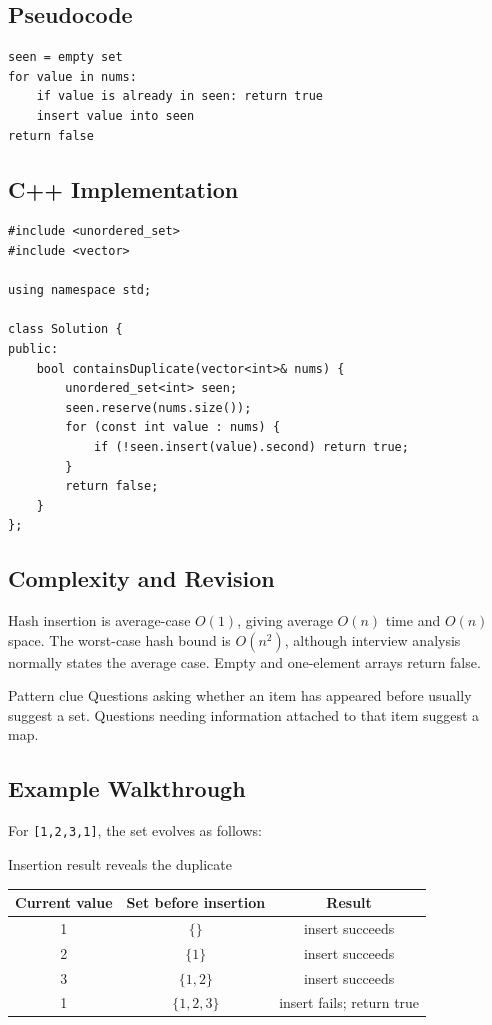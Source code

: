 \subsection{Pseudocode}
\begin{lstlisting}[style=pseudocode]
seen = empty set
for value in nums:
    if value is already in seen: return true
    insert value into seen
return false
\end{lstlisting}

\subsection{C++ Implementation}
\begin{lstlisting}[style=compactcode,caption={Complete C++ solution: Contains Duplicate}]
#include <unordered_set>
#include <vector>

using namespace std;

class Solution {
public:
    bool containsDuplicate(vector<int>& nums) {
        unordered_set<int> seen;
        seen.reserve(nums.size());
        for (const int value : nums) {
            if (!seen.insert(value).second) return true;
        }
        return false;
    }
};
\end{lstlisting}

\subsection{Complexity and Revision}
Hash insertion is average-case \(O(1)\), giving average \(O(n)\) time and
\(O(n)\) space. The worst-case hash bound is \(O(n^2)\), although interview
analysis normally states the average case. Empty and one-element arrays return
false.

\begin{revisionbox}{Pattern clue}
Questions asking whether an item has appeared before usually suggest a set.
Questions needing information attached to that item suggest a map.
\end{revisionbox}

\subsection{Example Walkthrough}
For \texttt{[1,2,3,1]}, the set evolves as follows:
\begin{dryrunbox}{Insertion result reveals the duplicate}
\begin{center}
\begin{tabular}{@{}c c c@{}}
\toprule
Current value & Set before insertion & Result \\
\midrule
1 & \(\{\}\) & insert succeeds \\
2 & \(\{1\}\) & insert succeeds \\
3 & \(\{1,2\}\) & insert succeeds \\
1 & \(\{1,2,3\}\) & insert fails; return true \\
\bottomrule
\end{tabular}
\end{center}
\end{dryrunbox}

